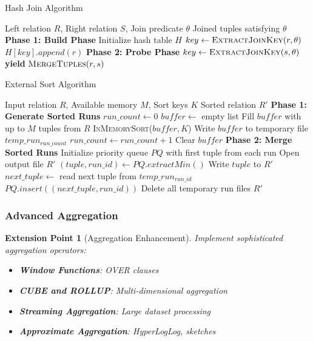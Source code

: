 \documentclass[12pt,a4paper]{article}
\newcommand{\CALL}[2]{\textsc{#1}(#2)}
\newtheorem{extension}{Extension Point}[section]
\begin{document}
\begin{algorithm}
\caption{Hash Join Algorithm}
\begin{algorithmic}[1]
\REQUIRE Left relation $R$, Right relation $S$, Join predicate $\theta$
\ENSURE Joined tuples satisfying $\theta$
\STATE \textbf{Phase 1: Build Phase}
\STATE Initialize hash table $H$
    \STATE $key \leftarrow \CALL{ExtractJoinKey}{r, \theta}$
    \STATE $H[key].append(r)$ 
\ENDFOR
\STATE \textbf{Phase 2: Probe Phase}
    \STATE $key \leftarrow \CALL{ExtractJoinKey}{s, \theta}$
            \IF{\CALL{EvaluateJoinCondition}{$r, s, \theta$}}
                \STATE \textbf{yield} $\CALL{MergeTuples}{r, s}$
            \ENDIF
        \ENDFOR
    \ENDIF
\ENDFOR
\end{algorithmic}
\end{algorithm}

\begin{algorithm}
\caption{External Sort Algorithm}
\begin{algorithmic}[1]
\REQUIRE Input relation $R$, Available memory $M$, Sort keys $K$
\ENSURE Sorted relation $R'$
\STATE \textbf{Phase 1: Generate Sorted Runs}
\STATE $run\_count \leftarrow 0$
\STATE $buffer \leftarrow$ empty list
    \STATE Fill $buffer$ with up to $M$ tuples from $R$
    \STATE \CALL{InMemorySort}{$buffer, K$}
    \STATE Write $buffer$ to temporary file $temp\_run_{run\_count}$
    \STATE $run\_count \leftarrow run\_count + 1$
    \STATE Clear $buffer$
\ENDWHILE
\STATE \textbf{Phase 2: Merge Sorted Runs}
\STATE Initialize priority queue $PQ$ with first tuple from each run
\STATE Open output file $R'$
    \STATE $(tuple, run\_id) \leftarrow PQ.extractMin()$
    \STATE Write $tuple$ to $R'$
        \STATE $next\_tuple \leftarrow$ read next tuple from $temp\_run_{run\_id}$
        \STATE $PQ.insert((next\_tuple, run\_id))$
    \ENDIF
\ENDWHILE
\STATE Delete all temporary run files
\RETURN $R'$
\end{algorithmic}
\end{algorithm}

\subsubsection{Advanced Aggregation}

\begin{extension}[Aggregation Enhancement]
Implement sophisticated aggregation operators:

\begin{itemize}
    \item \textbf{Window Functions}: OVER clauses
    \item \textbf{CUBE and ROLLUP}: Multi-dimensional aggregation
    \item \textbf{Streaming Aggregation}: Large dataset processing
    \item \textbf{Approximate Aggregation}: HyperLogLog, sketches
\end{itemize}
\end{extension}
\end{document}
